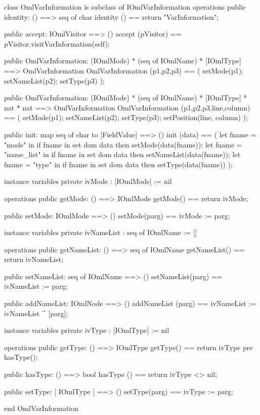 \begin{vdm_al}
class OmlVarInformation is subclass of IOmlVarInformation
operations
  public identity: () ==> seq of char
  identity () == return "VarInformation";

  public accept: IOmlVisitor ==> ()
  accept (pVisitor) == pVisitor.visitVarInformation(self);

  public OmlVarInformation:
    (IOmlMode) *
    (seq of IOmlName) *
    [IOmlType] ==> OmlVarInformation
  OmlVarInformation (p1,p2,p3) == 
    ( setMode(p1);
      setNameList(p2);
      setType(p3) );

  public OmlVarInformation:
    (IOmlMode) *
    (seq of IOmlName) *
    [IOmlType] *
    nat *
    nat ==> OmlVarInformation
  OmlVarInformation (p1,p2,p3,line,column) == 
    ( setMode(p1);
      setNameList(p2);
      setType(p3);
      setPosition(line, column) );

  public init: map seq of char to [FieldValue] ==> ()
  init (data) ==
    ( let fname = "mode" in
        if fname in set dom data
        then setMode(data(fname));
      let fname = "name_list" in
        if fname in set dom data
        then setNameList(data(fname));
      let fname = "type" in
        if fname in set dom data
        then setType(data(fname)) );

instance variables
  private ivMode : [IOmlMode] := nil

operations
  public getMode: () ==> IOmlMode
  getMode() == return ivMode;

  public setMode: IOmlMode ==> ()
  setMode(parg) == ivMode := parg;

instance variables
  private ivNameList : seq of IOmlName := []

operations
  public getNameList: () ==> seq of IOmlName
  getNameList() == return ivNameList;

  public setNameList: seq of IOmlName ==> ()
  setNameList(parg) == ivNameList := parg;

  public addNameList: IOmlNode ==> ()
  addNameList (parg) == ivNameList := ivNameList ^ [parg];

instance variables
  private ivType : [IOmlType] := nil

operations
  public getType: () ==> IOmlType
  getType() == return ivType
    pre hasType();

  public hasType: () ==> bool
  hasType () == return ivType <> nil;

  public setType: [ IOmlType ] ==> ()
  setType(parg) == ivType := parg;

end OmlVarInformation
\end{vdm_al}

